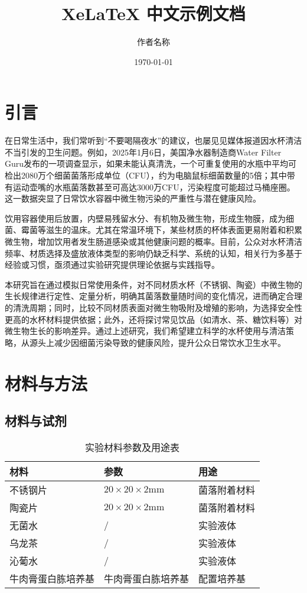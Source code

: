 \documentclass[12pt,a4paper]{article}
\title{XeLaTeX 中文示例文档}
\author{作者名称}
\date{\today}  %
\begin{document}
\maketitle  %

\begin{abstract}

\end{abstract}
\newpage
\tableofcontents

\newpage

\section{引言}
在日常生活中，我们常听到“不要喝隔夜水”的建议，也屡见见媒体报道因水杯清洁不当引发的卫生问题。例如，2025年1月6日，美国净水器制造商Water Filter Guru发布的一项调查显示，如果未能认真清洗，一个可重复使用的水瓶中平均可检出2080万个细菌菌落形成单位（CFU），约为电脑鼠标细菌数量的5倍；其中带有运动壶嘴的水瓶菌落数甚至可高达3000万CFU，污染程度可能超过马桶座圈。这一数据突显了日常饮水容器中微生物污染的严重性与潜在健康风险。

饮用容器使用后放置，内壁易残留水分、有机物及微生物，形成生物膜，成为细菌、霉菌等滋生的温床。尤其在常温环境下，某些材质的杯体表面更易附着和积累微生物，增加饮用者发生肠道感染或其他健康问题的概率。目前，公众对水杯清洁频率、材质选择及盛放液体类型的影响仍缺乏科学、系统的认知，相关行为多基于经验或习惯，亟须通过实验研究提供理论依据与实践指导。

本研究旨在通过模拟日常使用条件，对不同材质水杯（不锈钢、陶瓷）中微生物的生长规律进行定性、定量分析，明确其菌落数量随时间的变化情况，进而确定合理的清洗周期；同时，比较不同材质表面对微生物吸附及增殖的影响，为选择安全性更高的水杯材料提供依据；此外，还将探讨常见饮品（如清水、茶、糖饮料等）对微生物生长的影响差异。通过上述研究，我们希望建立科学的水杯使用与清洁策略，从源头上减少因细菌污染导致的健康风险，提升公众日常饮水卫生水平。


\section{材料与方法}
\subsection{材料与试剂}
\begin{table}[htbp]
  \centering
  \begin{tabular}{|l|l|l|}
    \hline
    材料 & 参数 & 用途 \\
    \hline
    不锈钢片 & \(20\times20\times2\mathrm{mm}\) & 菌落附着材料 \\
    \hline
    陶瓷片 & \(20\times20\times2\mathrm{mm}\) & 菌落附着材料 \\
    \hline
    无菌水 & / & 实验液体 \\
    \hline
    乌龙茶 & / & 实验液体 \\
    \hline
    沁葡水 & / & 实验液体 \\
    \hline
    牛肉膏蛋白胨培养基 & 牛肉膏蛋白胨培养基 & 配置培养基 \\
    \hline
  \end{tabular}
  \caption{实验材料参数及用途表}
  \label{tab:material}
\end{table}
\end{document}
